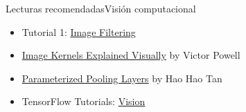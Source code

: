 \documentclass[10pt,border=3pt,tikz]{beamer}
\begin{document}
    \begin{frame}{Lecturas recomendadas}{Visión computacional}
        \begin{itemize}
            \item Tutorial 1: \colorbox{blue!10}{\href{https://ai.stanford.edu/~syyeung/cvweb/tutorial1.html}{Image Filtering}}
            \item \colorbox{blue!10}{\href{https://setosa.io/ev/image-kernels/}{Image Kernels Explained Visually}} by Victor Powell
            \item \colorbox{blue!10}{\href{https://gudgud96.github.io/2020/11/25/param-pooling/}{Parameterized Pooling Layers}} by Hao Hao Tan
            \item TensorFlow Tutorials: \colorbox{blue!10}{\href{https://www.tensorflow.org/tutorials/images}{Vision}}
            
        \end{itemize}
    \end{frame}

	
\end{document}
